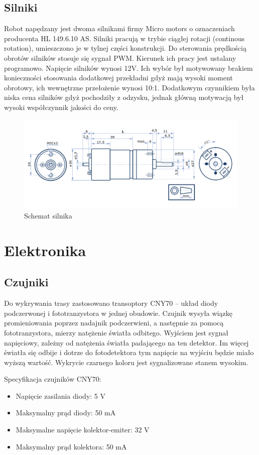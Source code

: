 \documentclass[11pt,a4paper]{article}
\begin{document}
\subsection{Silniki}
  Robot napędzany jest dwoma silnikami firmy Micro motors o oznaczeniach producenta HL 149.6.10 AS.
  Silniki pracują w trybie ciągłej rotacji (continous rotation), umieszczono je w tylnej części konstrukcji. 
  Do sterowania prędkością obrotów silników stosuje się sygnał PWM. Kierunek ich pracy jest ustalany programowo.
  Napięcie silników wynosi 12V.
  Ich wybór był motywowany brakiem konieczności stosowania dodatkowej przekładni gdyż mają wysoki moment obrotowy, ich wewnętrzne przełożenie wynosi 10:1. Dodatkowym czynnikiem była niska cena silników gdyż pochodziły z odzysku, jednak główną motywacją był wysoki współczynnik jakości do ceny.
 
  \begin{figure}[H]
  \includegraphics[scale=0.5]{engine_scheme}
  \caption{Schemat silnika}
\end{figure}

\section{Elektronika}
\subsection{Czujniki}
Do wykrywania trasy zastosowano transoptory CNY70 – układ diody podczerwonej i fototranzystora w jednej obudowie. 
Czujnik wysyła wiązkę promieniowania poprzez nadajnik podczerwieni, a następnie za pomocą fototranzystora, mierzy natężenie światła odbitego. 
Wyjściem jest sygnał napięciowy, zależny od natężenia światła padającego na ten detektor. Im więcej światła się odbije i dotrze do fotodetektora tym napięcie na wyjściu będzie miało wyższą wartość. Wykrycie czarnego koloru jest sygnalizowane stanem wysokim.

Specyfikacja czujników CNY70:
\begin{itemize}
  \item Napięcie zasilania diody: 5 V
  \item Maksymalny prąd diody: 50 mA
  \item Maksymalne napięcie kolektor-emiter: 32 V
  \item Maksymalny prąd kolektora: 50 mA
\end{itemize}
\end{document}
